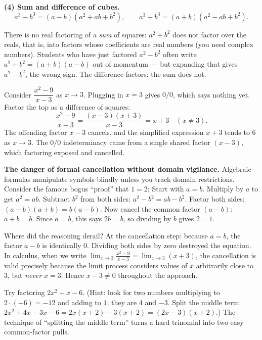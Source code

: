 \textbf{(4) Sum and difference of cubes.}
\[
  a^3 - b^3 = (a-b)(a^2 + ab + b^2), \qquad
  a^3 + b^3 = (a+b)(a^2 - ab + b^2).
\]

\begin{trapbox}
There is no real factoring of a \emph{sum} of squares: $a^2 + b^2$ does not factor
over the reals, that is, into factors whose coefficients are real numbers (you
need complex numbers). Students who have just factored $a^2 - b^2$
often write $a^2+b^2 = (a+b)(a-b)$ out of momentum --- but expanding that gives
$a^2 - b^2$, the wrong sign. The difference factors; the sum does not.
\end{trapbox}

\begin{example}
\label{ch40:ex-factor-limit}
Consider $\dfrac{x^2 - 9}{x - 3}$ as $x \to 3$. Plugging in $x=3$ gives $0/0$,
which says nothing yet. Factor the top as a difference of squares:
\[
  \frac{x^2 - 9}{x-3} = \frac{(x-3)(x+3)}{x-3} = x + 3 \quad (x \neq 3).
\]
The offending factor $x-3$ cancels, and the simplified expression $x+3$ tends to
$6$ as $x \to 3$. The $0/0$ indeterminacy came from a single shared factor $(x-3)$,
which factoring exposed and cancelled.
\end{example}

\begin{trapbox}
\textbf{The danger of formal cancellation without domain vigilance.}
Algebraic formulas manipulate symbols blindly unless you track domain restrictions.
Consider the famous bogus ``proof'' that $1 = 2$:
Start with $a = b$. Multiply by $a$ to get $a^2 = ab$. Subtract $b^2$ from both sides:
$a^2 - b^2 = ab - b^2$. Factor both sides: $(a-b)(a+b) = b(a-b)$. Now cancel the
common factor $(a-b)$: $a+b = b$. Since $a=b$, this says $2b = b$, so dividing by $b$
gives $2 = 1$.

Where did the reasoning derail? At the cancellation step: because $a=b$, the factor
$a-b$ is identically $0$. Dividing both sides by zero destroyed the equation.
In calculus, when we write $\lim_{x\to 3}\frac{x^2-9}{x-3} = \lim_{x\to 3}(x+3)$,
the cancellation is valid precisely because the limit process considers values of
$x$ arbitrarily close to $3$, but \emph{never} $x = 3$. Hence $x - 3 \neq 0$ throughout
the approach.
\end{trapbox}

\begin{walkbox}
Try factoring $2x^2 + x - 6$. (Hint: look for two numbers multiplying to
$2\cdot(-6) = -12$ and adding to $1$; they are $4$ and $-3$. Split the middle term:
$2x^2 + 4x - 3x - 6 = 2x(x+2) - 3(x+2) = (2x-3)(x+2)$.) The technique of
``splitting the middle term'' turns a hard trinomial into two easy common-factor
pulls.
\end{walkbox}

